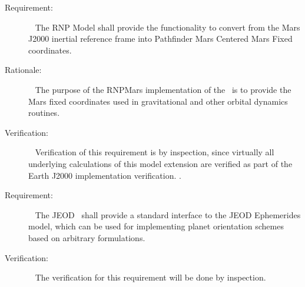 \label{reqt:mars_RNP_func}
\begin{description}
  \item[Requirement:]\ \newline
The RNP Model shall provide the functionality to convert from the Mars J2000
inertial reference frame into Pathfinder Mars Centered Mars Fixed coordinates.
  \item[Rationale:]\ \newline
The purpose of the RNPMars implementation of the
\ModelDesc\ is to provide the Mars fixed
coordinates used in gravitational and other orbital dynamics routines.
  \item[Verification:]\ \newline
Verification of this requirement is by inspection, since virtually all
underlying calculations of this model extension are verified as part of the
Earth J2000 implementation verification.
\cite{dynenv:JEOD}.
\end{description}

\label{reqt:Planet_Orientation_extension}
\begin{description}
\item[Requirement:]\ \newline
The JEOD \ModelDesc\ shall provide a standard interface to
the JEOD Ephemerides model, which can be used for implementing planet orientation
schemes based on arbitrary formulations.
\item[Verification:]\ \newline
The verification for this requirement will be done by inspection.
\end{description}

